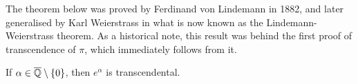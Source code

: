 
The theorem below was proved by Ferdinand von Lindemann in 1882, and later generalised by Karl Weierstrass in what is now known as the Lindemann-Weierstrass theorem. As a historical note, this result was behind the first proof of transcendence of $\pi$, which immediately follows from it.

\begin{theorem}[Lindemann]
If $\alpha \in \overline{\mathbb{Q}} \setminus \lbrace 0 \rbrace$, then $e^{\alpha}$ is transcendental.
\end{theorem}
